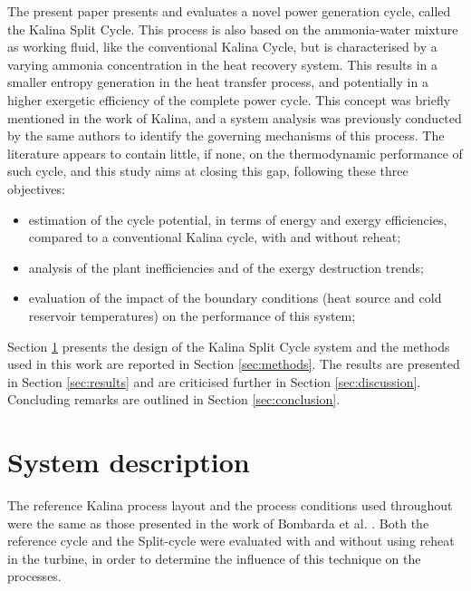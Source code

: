 \documentclass[final,times,5p]{elsarticle}
\begin{document}
The present paper presents and evaluates a novel power generation cycle, called the Kalina Split Cycle. This process is also based on the ammonia-water mixture as working fluid, like the conventional Kalina Cycle, but is characterised by a varying ammonia concentration in the heat recovery system. This results in a smaller entropy generation in the heat transfer process, and potentially in a higher exergetic efficiency of the complete power cycle. This concept was briefly mentioned in the work of Kalina, and a system analysis was previously conducted by the same authors to identify the governing mechanisms of this process. The literature appears to contain little, if none, on the thermodynamic performance of such cycle, and this study aims at closing this gap, following these three objectives:

\begin{itemize}

	\item estimation of the cycle potential, in terms of energy and exergy efficiencies, compared to a conventional Kalina cycle, with and without reheat;
	\item analysis of the plant inefficiencies and of the exergy destruction trends;
	\item evaluation of the impact of the boundary conditions (heat source and cold reservoir temperatures) on the performance of this system;

\end{itemize}

Section \ref{sec:system_description} presents the design of the Kalina Split Cycle system and the methods used in this work are reported in Section \ref{sec:methods}. The results are presented in Section \ref{sec:results} and are criticised further in Section \ref{sec:discussion}. Concluding remarks are outlined in Section \ref{sec:conclusion}.



\section{System description}
\label{sec:system_description} 
The reference Kalina process layout and the process conditions used throughout were the same as those presented in the work of Bombarda et al. \cite{Bombarda2010b}. Both the reference cycle and the Split-cycle were evaluated with and without using reheat in the turbine, in order to determine the influence of this technique on the processes. 
\end{document}
